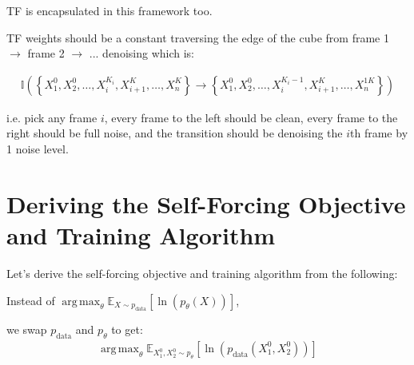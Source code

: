 \documentclass[11pt]{article}
\DeclareMathOperator*{\argmax}{arg\,max}
\begin{document}
\begin{center}
\end{center}


TF is encapsulated in this framework too.

TF weights should be a constant traversing the edge of the cube from frame 1 $\rightarrow$ frame 2 $\rightarrow$ ... denoising which is:

\begin{align}
\mathbb{I}\left( \left\{ X_1^0, X_2^0, \ldots, X_i^{K_i}, X_{i+1}^K, \ldots, X_n^K \right\} \rightarrow \left\{ X_1^0, X_2^0, \ldots, X_i^{K_i-1}, X_{i+1}^K, \ldots, X_n^{1K} \right\} \right)
\end{align}

i.e. pick any frame $i$, every frame to the left should be clean, every frame to the right should be full noise, and the transition should be denoising the $i$th frame by 1 noise level.


\section{Deriving the Self-Forcing Objective and Training Algorithm}

Let's derive the self-forcing objective and training algorithm from the following:

Instead of $\argmax_\theta \mathbb{E}_{X \sim p_{\text{data}}} \left[ \ln(p_\theta(X)) \right]$,

we swap $p_{\text{data}}$ and $p_\theta$ to get:
\begin{align}
\argmax_\theta \mathbb{E}_{X_1^0, X_2^0 \sim p_\theta} \left[ \ln(p_{\text{data}}(X_1^0, X_2^0)) \right]
\end{align}
\end{document}

